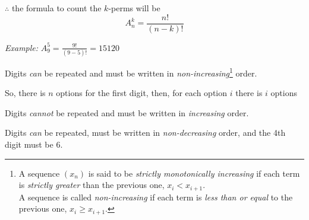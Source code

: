 \documentclass[a4paper,12pt]{article}
\begin{document}
\begin{tasks}
\begin{subtasks}
\begin{subsubtasks}
            \item $\therefore$ the formula to count the $k$-perms will be
            $$A_n^k = \frac{n!}{(n - k)!}$$

            \item \emph{Example:} $\displaystyle A_9^5 = \frac{9!}{(9 - 5)!} = 15120$
        \end{subsubtasks}
        
        \item Digits \emph{can} be repeated and must be written in \emph{non-increasing}\footnote{A sequence $(x_n)$ is said to be \emph{strictly monotonically increasing} if each term is \emph{strictly greater} than the previous one, \ie $x_i < x_{i+1}$.\\A sequence is called \emph{non-increasing} if each term is \emph{less than or equal} to the previous one, \ie $x_i \geqslant x_{i+1}$.} order.
        
        \begin{subsubtasks}
            \item So, there is $n$ options for the first digit, then, for each option $i$ there is $i$ options
        \end{subsubtasks}
        
        \item Digits \emph{cannot} be repeated and must be written in \emph{increasing} order.
        
        \item Digits \emph{can} be repeated, must be written in \emph{non-decreasing} order, and the 4th digit must be 6.
    \end{subtasks}
\end{tasks}
\end{document}
